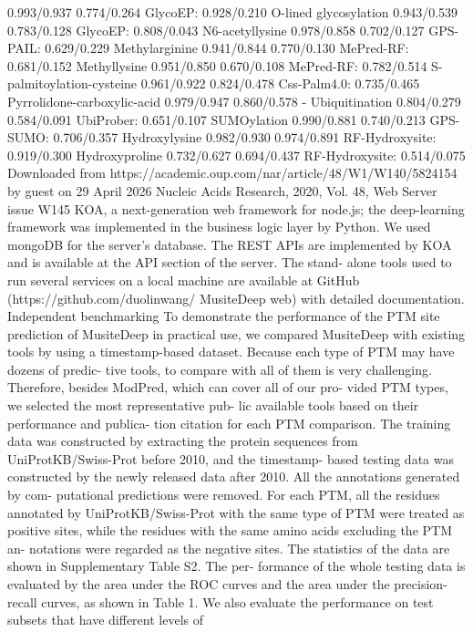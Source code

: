 0.993/0.937
0.774/0.264
GlycoEP: 0.928/0.210
O-lined glycosylation
0.943/0.539
0.783/0.128
GlycoEP: 0.808/0.043
N6-acetyllysine
0.978/0.858
0.702/0.127
GPS-PAIL: 0.629/0.229
Methylarginine
0.941/0.844
0.770/0.130
MePred-RF: 0.681/0.152
Methyllysine
0.951/0.850
0.670/0.108
MePred-RF: 0.782/0.514
S-palmitoylation-cysteine
0.961/0.922
0.824/0.478
Css-Palm4.0: 0.735/0.465
Pyrrolidone-carboxylic-acid
0.979/0.947
0.860/0.578
-
Ubiquitination
0.804/0.279
0.584/0.091
UbiProber: 0.651/0.107
SUMOylation
0.990/0.881
0.740/0.213
GPS-SUMO: 0.706/0.357
Hydroxylysine
0.982/0.930
0.974/0.891
RF-Hydroxysite: 0.919/0.300
Hydroxyproline
0.732/0.627
0.694/0.437
RF-Hydroxysite: 0.514/0.075
Downloaded from https://academic.oup.com/nar/article/48/W1/W140/5824154 by guest on 29 April 2026
Nucleic Acids Research, 2020, Vol. 48, Web Server issue W145
KOA, a next-generation web framework for node.js; the
deep-learning framework was implemented in the business
logic layer by Python. We used mongoDB for the server’s
database. The REST APIs are implemented by KOA and
is available at the API section of the server. The stand-
alone tools used to run several services on a local machine
are available at GitHub (https://github.com/duolinwang/
MusiteDeep web) with detailed documentation.
Independent benchmarking
To demonstrate the performance of the PTM site prediction
of MusiteDeep in practical use, we compared MusiteDeep
with existing tools by using a timestamp-based dataset.
Because each type of PTM may have dozens of predic-
tive tools, to compare with all of them is very challenging.
Therefore, besides ModPred, which can cover all of our pro-
vided PTM types, we selected the most representative pub-
lic available tools based on their performance and publica-
tion citation for each PTM comparison. The training data
was constructed by extracting the protein sequences from
UniProtKB/Swiss-Prot before 2010, and the timestamp-
based testing data was constructed by the newly released
data after 2010. All the annotations generated by com-
putational predictions were removed. For each PTM, all
the residues annotated by UniProtKB/Swiss-Prot with the
same type of PTM were treated as positive sites, while the
residues with the same amino acids excluding the PTM an-
notations were regarded as the negative sites. The statistics
of the data are shown in Supplementary Table S2. The per-
formance of the whole testing data is evaluated by the area
under the ROC curves and the area under the precision-
recall curves, as shown in Table 1. We also evaluate the
performance on test subsets that have different levels of
